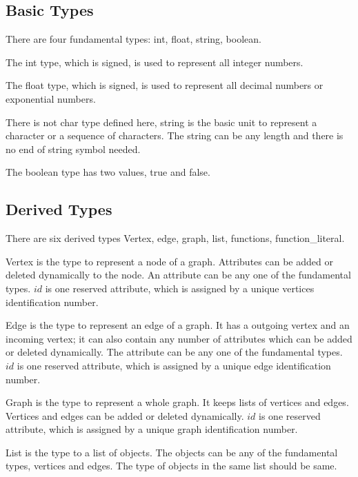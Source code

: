 \documentclass[letterpaper,12pt]{article}
\begin{document}
\subsection{Basic Types}\label{sec:basic_types}
There are four fundamental types: int, float, string, boolean. \newline

The int type, which is signed, is used to represent all integer numbers. \newline

The float type, which is signed, is used to represent all decimal numbers or exponential numbers. \newline

There is not char type defined here, string is the basic unit to represent a character or a sequence of characters. The string can be any length and there is no end of string symbol needed. \newline

The boolean type has two values, true and false.

\subsection{Derived Types}\label{sec:derType}
There are six derived types Vertex, edge, graph, list, functions, function\_literal.\newline

  Vertex is the type to represent a node of a graph. Attributes can be added or deleted dynamically to the node. An attribute can be any one of the fundamental types. $id$ is one reserved attribute, which is assigned by a unique vertices identification number. \newline

  Edge is the type to represent an edge of a graph. It has a outgoing vertex and an incoming vertex; it can also contain any number of attributes which can be added or deleted dynamically. The attribute can be any one of the fundamental types. $id$ is one reserved attribute, which is assigned by a unique edge identification number. \newline

  Graph is the type to represent a whole graph. It keeps lists of vertices and edges. Vertices and edges can be added or deleted dynamically. $id$ is one reserved attribute, which is assigned by a unique graph identification number. \newline

  List is the type to a list of objects. The objects can be any of the fundamental types, vertices and edges. The type of objects in the same list should be same. \newline
\end{document}
